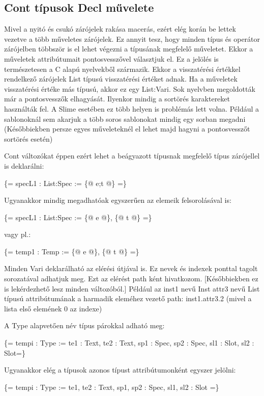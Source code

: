 \subsection{Cont típusok Decl művelete}
Mivel a nyitó és csukó zárójelek rakása macerás, ezért elég korán be lettek vezetve a több műveletes zárójelek.
Ez annyit tesz, hogy minden típus és operátor zárójelben többször is el lehet végezni a típusának megfelelő műveletet.
Ekkor a műveletek attribútumait pontosvesszővel választjuk el.
Ez a jelölés is természetesen a C alapú nyelvekből származik. 
Ekkor a visszatérési értékkel rendelkező zárójelek List típusú visszatérési értéket adnak.
Ha a műveletek visszatérési értéke más típusú, akkor ez egy List:Vari. 
Sok nyelvben megoldották már a pontosvesszők elhagyását.
Ilyenkor mindig a sortörés karaktereket használták fel.
A Slime  esetében ez több helyen is problémás lett volna.
Például a sablonoknál sem akarjuk a több soros sablonokat mindig egy sorban megadni
(Későbbiekben persze egyes műveleteknél el lehet majd hagyni a pontosvesszőt sortörés esetén)

Cont változókat éppen ezért lehet a beágyazott típusnak megfelelő típus zárójellel is deklarálni:

\{= specL1 : List:Spec := \{@ e;t @\} =\}

Ugyanakkor mindig megadhatóak egyszerűen az elemeik felsorolásával is:

\{= specL1 : List:Spec := \{@ e @\}, \{@ t @\} =\}

vagy pl.:

\{= temp1 : Temp := \{@ e @\}, \{@ t @\} =\}

Minden Vari deklarálható az elérési útjával is.
Ez nevek és indexek ponttal tagolt sorozatával adhatjuk meg.
Ezt az elérést path ként hivatkozom.
[Későbbiekben ez is lekérdezhető lesz minden változóból.]
Például az inst1 nevű Inst attr3 nevű List típusú attribútumának a harmadik eleméhez vezető path: inst1.attr3.2 
(mivel a lista első elemének 0 az indexe)

A Type alapvetően név típus párokkal adható meg:

\{= tempi : Type := te1 : Text, te2 : Text, sp1 : Spec, sp2 : Spec, sl1 : Slot, sl2 : Slot=\}

Ugyanakkor elég a típusok azonos típust attribútumonként egyszer jelölni:

\{= tempi : Type := te1, te2 : Text, sp1, sp2 : Spec, sl1, sl2 : Slot =\}

